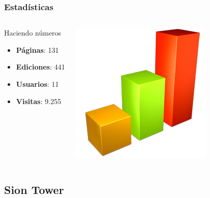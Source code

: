 \documentclass[green]{beamer}
\begin{document}
\begin{frame}
\transdissolve
    \frametitle{Estadísticas}

    \begin{columns}[t]
    \column{150pt}
        
	\begin{block}{Haciendo números}
            \begin{itemize}
                \item \textbf{Páginas}: 131
		\item \textbf{Ediciones}: 441
		\item \textbf{Usuarios}: 11
		\item \textbf{Visitas}: 9.255
            \end{itemize}            
        \end{block}

    \column{150pt}

	\begin{center}
	    \includegraphics[scale=0.25]{img/estadisticas.png}
	\end{center}

    \end{columns} 

\end{frame}

\subsection{Sion Tower}
\end{document}
